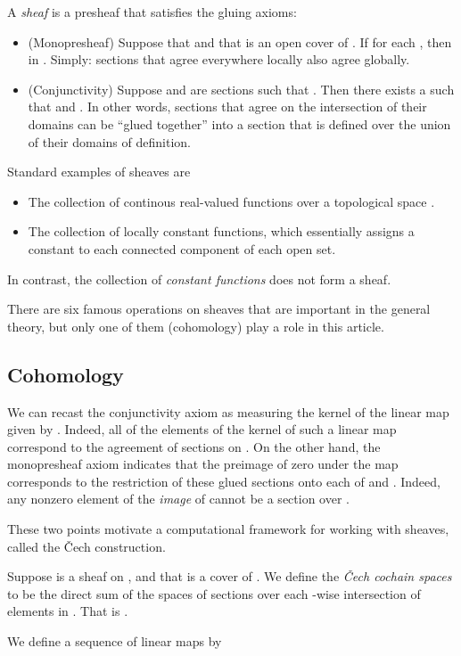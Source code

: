 \documentclass{amsart}
\theoremstyle{plain}
\theoremstyle{definition}
\begin{document}
A {\it sheaf}  is a presheaf  that satisfies the gluing axioms:
\begin{itemize}
\item (Monopresheaf) Suppose that  and that  is an open cover of .  If  for
  each , then  in .  Simply: sections that agree
  everywhere locally also agree globally.
\item (Conjunctivity) Suppose  and  are
  sections such that .  Then
  there exists a  such that  and .  In other words, sections that
  agree on the intersection of their domains can be ``glued together''
  into a section that is defined over the union of their domains of
  definition.
\end{itemize}

Standard examples of sheaves are 
\begin{itemize}
\item The collection of continous real-valued functions
   over a topological space .
\item The collection of locally constant functions, which essentially
  assigns a constant to each connected component of each open set.  
\end{itemize}
In contrast, the collection of {\it constant functions} does not form
a sheaf.  

There are six famous operations on sheaves that are important in the
general theory, but only one of them (cohomology)
play a role in this article.

\subsection{Cohomology}
We can recast the conjunctivity axiom as measuring the kernel of the
linear map  given by .
Indeed, all of the elements of the kernel of such a linear map
correspond to the agreement of sections on .
On the other hand, the monopresheaf axiom indicates that the preimage
of zero under the map  corresponds to the restriction of these
glued sections onto each of  and .  Indeed, any nonzero element
of the {\it image} of  cannot be a section over .  

These two points motivate a computational framework for working with
sheaves, called the \v{C}ech construction.  

Suppose  is a sheaf on , and that  is a cover
of .  We define the {\it \v{C}ech cochain spaces}
 to be the direct sum of
the spaces of sections over each -wise intersection of elements in
.  That is 
.

We define a sequence of linear maps 
by 
\end{document}
